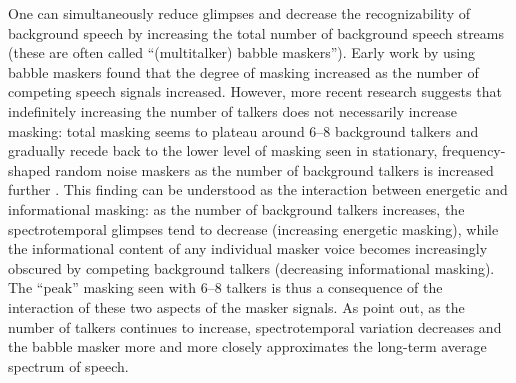 One can simultaneously reduce glimpses and decrease the recognizability of background speech by increasing the total number of background speech streams (these are often called “(multitalker) babble maskers”).  Early work by \citet{Miller1947} using babble maskers found that the degree of masking increased as the number of competing speech signals increased.  However, more recent research suggests that indefinitely increasing the number of talkers does not necessarily increase masking: total masking seems to plateau around 6–8 background talkers and gradually recede back to the lower level of masking seen in stationary, frequency-shaped random noise maskers as the number of background talkers is increased further \citep{BrungartEtAl2001,SimpsonCooke2005}.  This finding can be understood as the interaction between energetic and informational masking: %
as the number of background talkers increases, the spectrotemporal glimpses tend to decrease (increasing energetic masking), while the informational content of any individual masker voice becomes increasingly obscured by competing background talkers (decreasing informational masking).  The “peak” masking seen with 6–8 talkers is thus a consequence of the interaction of these two aspects of the masker signals.  As \citeauthor{SimpsonCooke2005} point out, as the number of talkers continues to increase, spectrotemporal variation decreases and the babble masker more and more closely approximates the long-term average spectrum of speech.


